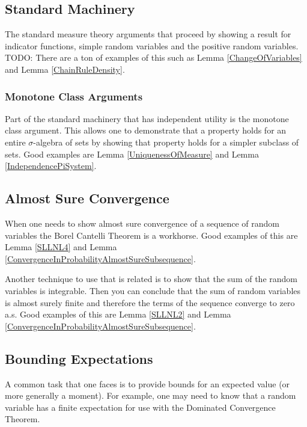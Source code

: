 \documentclass{amsart}
\theoremstyle{remark}
\theoremstyle{definition}
\begin{document}
\subsection{Standard Machinery}
The standard measure theory arguments that proceed by showing a result
for indicator functions, simple random variables and the positive
random variables.  TODO:  There are a ton of examples of this such as
Lemma \ref{ChangeOfVariables} and Lemma \ref{ChainRuleDensity}.

\subsubsection{Monotone Class Arguments}
Part of the standard machinery that has independent utility is the
monotone class argument.  This allows one to demonstrate that a
property holds for an entire $\sigma$-algebra of sets by showing that
property holds for a simpler subclass of sets.  Good examples are
Lemma \ref{UniquenessOfMeasure} and Lemma \ref{IndependencePiSystem}.

\subsection{Almost Sure Convergence}
When one needs to show almost sure convergence of a sequence of random
variables the Borel Cantelli Theorem is a workhorse.  Good examples of
this are Lemma \ref{SLLNL4} and Lemma
\ref{ConvergenceInProbabilityAlmostSureSubsequence}.

Another technique to use that is related is to show that the sum of
the random variables is integrable.  Then you can conclude that the
sum of random variables is almost surely finite and therefore the
terms of the sequence converge to zero a.s.
Good examples of
this are Lemma \ref{SLLNL2} and Lemma
\ref{ConvergenceInProbabilityAlmostSureSubsequence}.

\subsection{Bounding Expectations}

A common task that one faces is to provide bounds for an expected
value (or more generally a moment).  For example, one may need to know
that a random variable has a finite expectation for use with the
Dominated Convergence Theorem.
\end{document}
